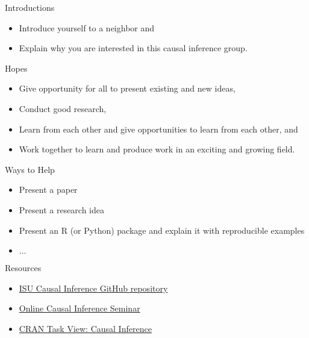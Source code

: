 \documentclass{beamer} %
\begin{document}
\begin{frame}{Introductions}

\begin{itemize}
    \item<2-> Introduce yourself to a neighbor and
    \item<2-> Explain why you are interested in this causal inference group.
\end{itemize}

    
\end{frame}

\begin{frame}{Hopes}

\begin{itemize}
    \item Give opportunity for all to present existing and new ideas,
    \item Conduct good research,
    \item Learn from each other and give opportunities to learn from each other, and
    \item Work together to learn and produce work in an exciting and growing field.
\end{itemize}
    
\end{frame}

\begin{frame}{Ways to Help}

\begin{itemize}
    \item Present a paper
    \item Present a research idea
    \item Present an R (or Python) package and explain it with reproducible examples
    \item $\dots$
\end{itemize}

\end{frame}

\begin{frame}{Resources}

\begin{itemize}
    \item \href{https://github.com/calebleedy/ISU-Causal}{ISU Causal Inference GitHub repository}
    \item \href{https://sites.google.com/view/ocis/}{Online Causal Inference Seminar}
    \item \href{https://cran.r-project.org/web/views/CausalInference.html}{CRAN Task View: Causal Inference}
\end{itemize}
    
\end{frame}
\end{document}
